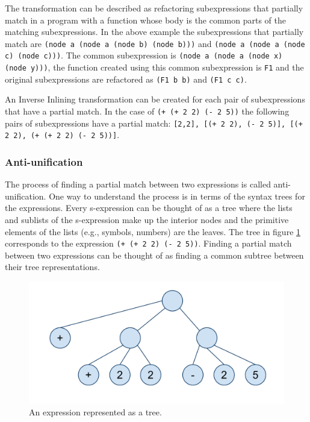 \documentclass[a4paper,10pt]{article}
\begin{document}
  The transformation can be described as refactoring subexpressions that partially match in a program with a function whose body is the common parts of the matching subexpressions.  In the above example the subexpressions that partially match are \texttt{(node a (node a (node b) (node b)))} and \texttt{(node a (node a (node c) (node c)))}.  The common subexpression is \texttt{(node a (node a (node x) (node y)))}, the function created using this common subexpression is \texttt{F1} and the original subexpressions are refactored as \texttt{(F1 b b)} and \texttt{(F1 c c)}.

An Inverse Inlining transformation can be created for each pair of subexpressions that have a partial match.  In the case of \texttt{(+ (+ 2 2) (- 2 5))} the following pairs of subexpressions have a partial match: \texttt{[2,2], [(+ 2 2), (- 2 5)], [(+ 2 2), (+ (+ 2 2) (- 2 5))]}.
\subsubsection{Anti-unification}
The process of finding a partial match between two expressions is called anti-unification.  One way to understand the process is in terms of the syntax trees for the expressions.  Every s-expression can be thought of as a tree where the lists and sublists of the s-expression make up the interior nodes and the primitive elements of the lists (e.g., symbols, numbers) are the leaves.  The tree in figure \ref{expressionTree} corresponds to the expression \texttt{(+ (+ 2 2) (- 2 5))}.  Finding a partial match between two expressions can be thought of as finding a common subtree between their tree representations.
\begin{figure}[h]
\begin{center}
\includegraphics[scale=.40]{expressionTree.pdf}
\caption{An expression represented as a tree.}
\label{expressionTree}
\end{center}
\end{figure}
\end{document}
